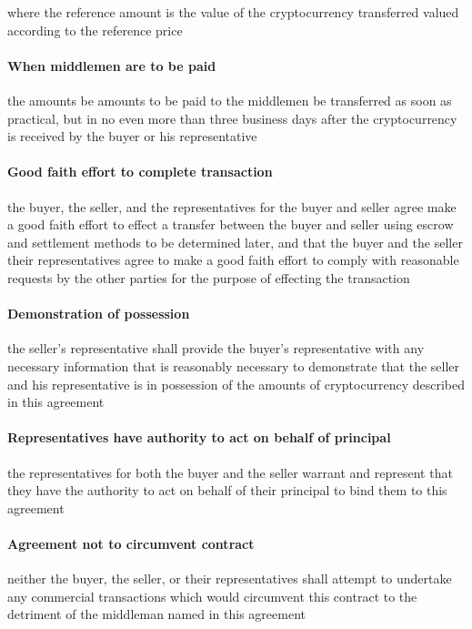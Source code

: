 \documentclass[10pt]{article}
\begin{document}
where the reference amount is the value of the cryptocurrency transferred valued according to the reference price

\paragraph{When middlemen are to be paid} the amounts be amounts to be paid to the middlemen be transferred as soon as practical, but in no even more than three business days after the cryptocurrency is received by the buyer or his representative

\paragraph{Good faith effort to complete transaction} the buyer, the seller, and the representatives for the buyer and seller agree make a good faith effort to effect a transfer between the buyer and seller using escrow and settlement methods to be determined later, and that the buyer and the seller their representatives agree to make a good faith effort to comply with reasonable requests by the other parties for the purpose of effecting the transaction

\paragraph{Demonstration of possession} the seller’s representative shall provide the buyer’s representative with any necessary information that is reasonably necessary to demonstrate that the seller and his representative is in possession of the amounts of cryptocurrency described in this agreement

\paragraph{Representatives have authority to act on behalf of principal} the representatives for both the buyer and the seller warrant and represent that they have the authority to act on behalf of their principal to bind them to this agreement

\paragraph{Agreement not to circumvent contract} neither the buyer, the seller, or their representatives shall attempt to undertake any commercial transactions which would circumvent this contract to the detriment of the middleman named in this agreement
\end{document}

